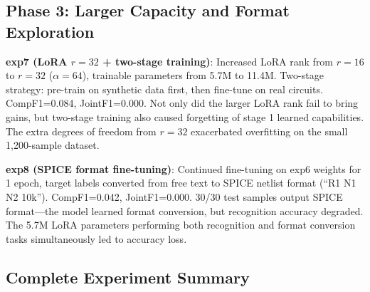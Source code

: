 \subsection{Phase 3: Larger Capacity and Format Exploration}

\textbf{exp7 (LoRA $r=32$ + two-stage training)}: Increased LoRA rank from $r=16$ to $r=32$ ($\alpha=64$), trainable parameters from 5.7M to 11.4M. Two-stage strategy: pre-train on synthetic data first, then fine-tune on real circuits. CompF1=0.084, JointF1=0.000. Not only did the larger LoRA rank fail to bring gains, but two-stage training also caused forgetting of stage 1 learned capabilities. The extra degrees of freedom from $r=32$ exacerbated overfitting on the small 1,200-sample dataset.

\textbf{exp8 (SPICE format fine-tuning)}: Continued fine-tuning on exp6 weights for 1 epoch, target labels converted from free text to SPICE netlist format (``R1 N1 N2 10k''). CompF1=0.042, JointF1=0.000. 30/30 test samples output SPICE format---the model learned format conversion, but recognition accuracy degraded. The 5.7M LoRA parameters performing both recognition and format conversion tasks simultaneously led to accuracy loss.


\subsection{Complete Experiment Summary}

